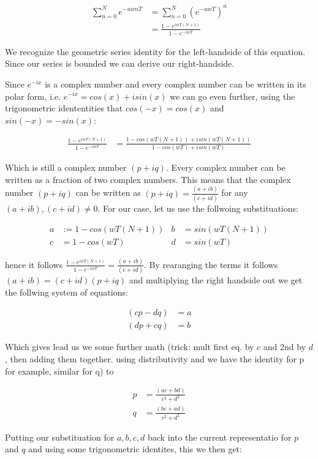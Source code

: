 \begin{align*}
\sum_{n=0}^N e^{-uwnT}
& =\sum_{n=0}^N (e^{-uwT})^n \\
& =\frac{1-e^{iwT(N+1)}}{1-e^{-iwT}}
\end{align*}

We recognize the geometric series identity for the left-handside of this equation. Since our series is bounded we can derive our right-handside.

Since $e^{-ix}$ is a complex number and every complex number can be written in its polar form, i.e. $e^{-ix} = cos(x) + i sin(x)$ we can go even further, using the trigonometric idententities that $cos(-x) = cos(x)$ and $sin(-x) = -sin(x)$:

\begin{align*}
\frac{1-e^{iwT(N+1)}}{1-e^{-iwT}}
& =\frac{1-cos(wT(N+1)) + i sin(wT(N+1)) }{1-cos(wT) + i sin(wT)}
\end{align*}

Which is still a complex number $(p+iq)$. Every complex number can be written as a fraction of two complex numbers. This means that the complex number $(p+iq)$ can be written as $(p+iq) = \frac{(a+ib)}{(c+id)}$ for any $(a+ib), (c+id) \neq 0$. 
For our case, let us use the follwoing substituations: 

\begin{align}
a& := 1 - cos(wT(N+1))&
b& =sin(wT(N+1))\\
c& =1-cos(wT)&
d& =sin(wT)
\end{align}

hence it follows $\frac{1-e^{iwT(N+1)}}{1-e^{-iwT}} = \frac{(a+ib)}{(c+id)}$.
By rearanging the terms it follows $(a+ib) = (c+id)(p+iq)$ and multiplying the right handside out we get the follwing system of equations:

\begin{align}
(cp-dq)& =a\\
(dp + cq)& =b
\end{align}

Which gives lead us we some further math (trick: mult first eq. by $c$ and 2nd by $d$, then adding them together. using distributivity and we have the identity for p for example, similar for q) to 

\begin{align}
p& =\frac{(ac+bd)}{c^2 + d^2}\\
q& =\frac{(bc+ad)}{c^2 + d^2}
\end{align}


Putting our substituation for $a, b, c, d$ back into the current representatio for $p$ and $q$ and using some trigonometric identites, this we then get:

